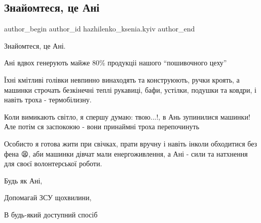  
 
 
 
 
 
\subsection{Знайомтеся, це Ані}
\label{sec:18_10_2022.fb.hazhilenko_ksenia.kyiv.1.ce_ani}
 
\ifcmt
 author_begin
   author_id hazhilenko_ksenia.kyiv
 author_end
\fi

Знайомтеся, це Ані.

Ані вдвох генерують майже 80\% продукціі нашого \enquote{пошивочного цеху}

Їхні кмітливі голівки невпинно винаходять та конструюють, ручки кроять, а
машинки строчать безкінечні теплі рукавиці, бафи, устілки, подушки та ковдри, і
навіть троха - термобілизну.

Коли вимикають світло, я спершу думаю: твою...!, в Ань зупинилися машинки! Але
потім ся заспокоюю - вони принаймні троха перепочинуть

Особисто я готова жити при свічках, прати вручну і навіть інколи обходитися без
фена 😫, аби машинки дівчат мали енергоживлення, а Ані - сили та натхнення для
своєї волонтерської роботи.

Будь як Ані,

Допомагай ЗСУ щохвилини,

В будь-який доступний спосіб

